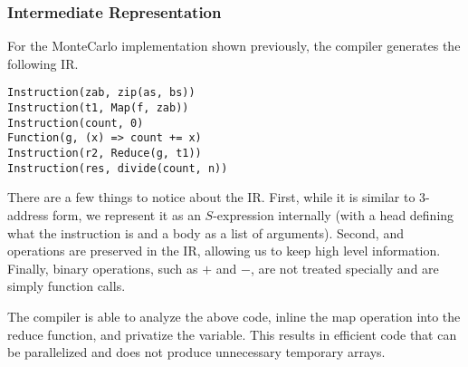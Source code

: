 \subsubsection{Intermediate Representation}

For the MonteCarlo implementation shown previously, the 
	compiler generates the following IR.

\begin{verbatim}
Instruction(zab, zip(as, bs))
Instruction(t1, Map(f, zab))
Instruction(count, 0)
Function(g, (x) => count += x)
Instruction(r2, Reduce(g, t1))
Instruction(res, divide(count, n))
\end{verbatim}

There are a few things to notice about the IR.
First, while it is similar to $3$-address form,
	we represent it as an $S$-expression internally 
	(with a head defining what the instruction is and a body
	as a list of arguments).
Second,  and  operations are preserved in the IR, 
	allowing us to keep high level information.
Finally, binary operations, such as $+$ and $-$, are not
	treated specially and are simply function calls.

The compiler is able to analyze the above code, inline the map operation
into the reduce function, and privatize the  variable. This
results in efficient code that can be parallelized and does not produce
unnecessary temporary arrays.
